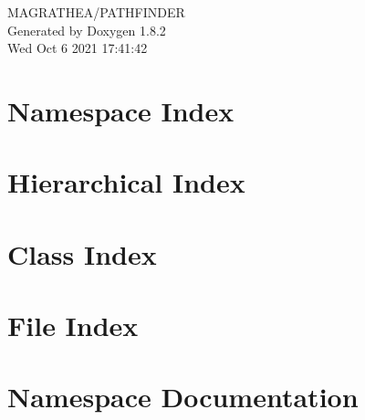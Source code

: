 \documentclass{book}
\begin{document}
\hypersetup{pageanchor=false,citecolor=blue}
\begin{titlepage}
\vspace*{7cm}
\begin{center}
{\Large M\-A\-G\-R\-A\-T\-H\-E\-A/\-P\-A\-T\-H\-F\-I\-N\-D\-E\-R }\\
\vspace*{1cm}
{\large Generated by Doxygen 1.8.2}\\
\vspace*{0.5cm}
{\small Wed Oct 6 2021 17:41:42}\\
\end{center}
\end{titlepage}
\clearemptydoublepage
{}
\tableofcontents
\clearemptydoublepage
{}
\hypersetup{pageanchor=true,citecolor=blue}
\chapter{Namespace Index}

\chapter{Hierarchical Index}

\chapter{Class Index}

\chapter{File Index}

\chapter{Namespace Documentation}

\end{document}
